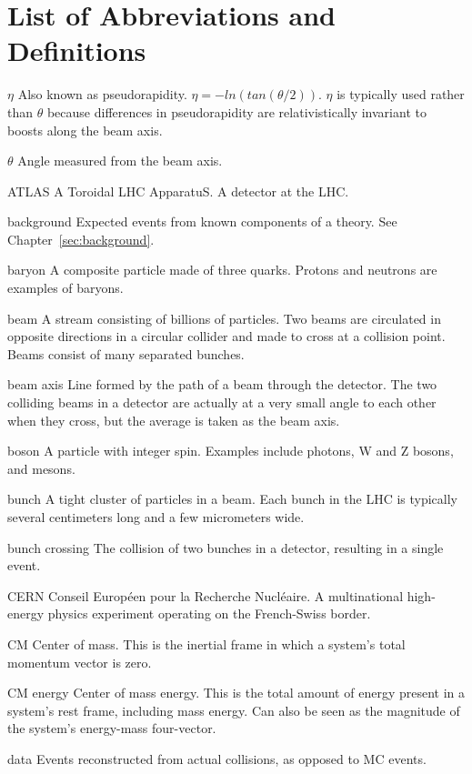 \chapter*{List of Abbreviations and Definitions}

\begin{symbollist*}
\item[$\eta$] Also known as pseudorapidity. $\eta=-ln(tan(\theta/2))$. $\eta$ is typically used rather than $\theta$ because differences in pseudorapidity are relativistically invariant to boosts along the beam axis.
\item[$\theta$] Angle measured from the beam axis.
\item[ATLAS] A Toroidal LHC ApparatuS. A detector at the LHC.
\item[background] Expected events from known components of a theory. See Chapter~\ref{sec:background}.
\item[baryon] A composite particle made of three quarks. Protons and neutrons are examples of baryons.
\item[beam] A stream consisting of billions of particles. Two beams are circulated in opposite directions in a circular collider and made to cross at a collision point. Beams consist of many separated bunches.
\item[beam axis] Line formed by the path of a beam through the detector. The two colliding beams in a detector are actually at a very small angle to each other when they cross, but the average is taken as the beam axis.
\item[boson] A particle with integer spin. Examples include photons, W and Z bosons, and mesons.
\item[bunch] A tight cluster of particles in a beam. Each bunch in the LHC is typically several centimeters long and a few micrometers wide.
\item[bunch crossing] The collision of two bunches in a detector, resulting in a single event.
\item[CERN] Conseil Européen pour la Recherche Nucléaire. A multinational high-energy physics experiment operating on the French-Swiss border.
\item[CM] Center of mass. This is the inertial frame in which a system's total momentum vector is zero.
\item[CM energy] Center of mass energy. This is the total amount of energy present in a system's rest frame, including mass energy. Can also be seen as the magnitude of the system's energy-mass four-vector.
\item[data] Events reconstructed from actual collisions, as opposed to MC events.

\end{symbollist*}
